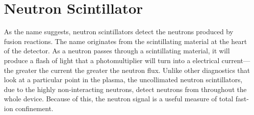 \section{Neutron Scintillator}
As the name suggests, neutron scintillators detect the neutrons produced by fusion reactions. The name originates from the scintillating material at the heart of the detector. As a neutron passes through a scintillating material, it will produce a flash of light that a photomultiplier will turn into a electrical current---the greater the current the greater the neutron flux. Unlike other diagnostics that look at a particular point in the plasma, the uncollimated neutron scintillators, due to the highly non-interacting neutrons, detect neutrons from throughout the whole device. Because of this, the neutron signal is a useful measure of total fast-ion confinement.

